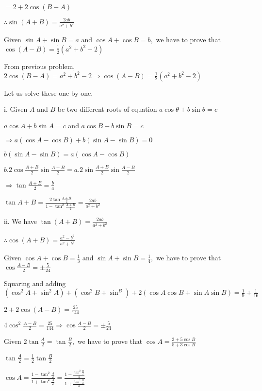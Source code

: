   $= 2 + 2\cos(B - A)$

  $\therefore \sin(A + B) = \frac{2ab}{a^2 + b^2}$

\item Given $\sin A + \sin B = a$ and $\cos A + \cos B = b,$ we have to prove that $\cos(A - B) =
  \frac{1}{2}(a^2 + b^2 - 2)$

  From previous problem, $2\cos(B - A) = a^2 + b^2 - 2 \Rightarrow \cos(A - B) = \frac{1}{2}(a^2 + b^2 - 2)$

\item Let us solve these one by one.

  i. Given $A$ and $B$ be two different roots of equation $a\cos\theta + b\sin\theta = c$

  $a\cos A + b\sin A = c$ and $a\cos B + b\sin B = c$

  $\Rightarrow a(\cos A - \cos B) + b(\sin A - \sin B) = 0$

  $b(\sin A - \sin B) = a(\cos A - \cos B)$

  $b.2\cos\frac{A + B}{2}\sin\frac{A - B}{2} = a.2\sin\frac{A + B}{2}\sin \frac{A - B}{2}$

  $\Rightarrow \tan\frac{A + B}{2} = \frac{b}{a}$

  $\tan{A + B} = \frac{2\tan\frac{A + B}{2}}{1 - \tan^2\frac{A + B}{2}} = \frac{2ab}{a^2 + b^2}$

  ii. We have $\tan(A + B) = \frac{2ab}{a^2 + b^2}$

  $\therefore \cos(A + B) = \frac{a^2 - b^2}{a^2 + b^2}$

\item Given $\cos A + \cos B = \frac{1}{3}$ and $\sin A + \sin B = \frac{1}{4},$ we have to prove that $\cos
  \frac{A - B}{2} = \pm\frac{5}{24}$

  Squaring and adding $(\cos^2A + \sin^2A) + (\cos^2B + \sin^B) + 2(\cos A\cos B + \sin A\sin B) = \frac{1}{9} +
  \frac{1}{16}$

  $2 + 2\cos(A - B) = \frac{25}{144}$

  $4\cos^2\frac{A - B}{2} = \frac{25}{144} \Rightarrow \cos\frac{A - B}{2} = \pm\frac{5}{24}$

\item Given $2\tan \frac{A}{2} = \tan \frac{B}{2},$ we have to prove that $\cos A = \frac{3 + 5\cos B}{5 + 3\cos B}$

  $\tan\frac{A}{2} = \frac{1}{2}\tan\frac{B}{2}$

  $\cos A = \frac{1 - \tan^2\frac{A}{2}}{1 + \tan^2\frac{A}{2}} = \frac{1 - \frac{\tan^2\frac{B}{2}}{4}}{1 +
  \frac{\tan^2\frac{B}{2}}{4}}$

